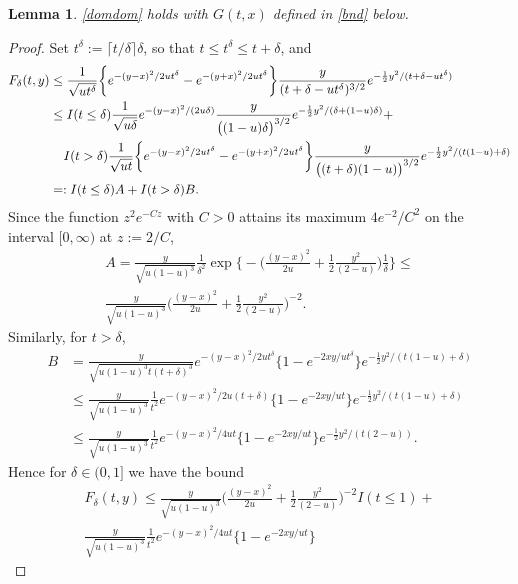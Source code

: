 \documentclass[reqno,10pt]{amsart}
\newtheorem{lem}[thm]{Lemma}
\theoremstyle{definition}
\theoremstyle{remark}
\numberwithin{equation}{section}
\begin{document}
\begin{lem}\label{lem}
\eqref{domdom} holds with $G(t,x)$ defined in \eqref{bnd} below.
\end{lem}
\begin{proof}
Set $t^\delta :=\lceil t/\delta\rceil\delta$, so that
$t\le t^\delta\le t+\delta$, and
\begin{align*}
F_\delta(t,y)&\le
\frac{1}{\sqrt{ u t^\delta}}\bigg\{
e^{-(y-x)^2/2u t^\delta}-e^{-(y+x)^2/2u t^\delta}\bigg\}
\frac{y}{ (t+\delta-ut^\delta)^{3/2}}e^{-\frac 1 2 y^2/(t+\delta-ut^\delta)}
\\
&\le I(t\le \delta)\frac{1}{\sqrt{ u \delta}}e^{-(y-x)^2/(2u \delta)}
\frac{y}{ \big((1-u)\delta\big)^{3/2}}e^{-\frac 1 2 y^2/(\delta+(1-u)\delta)}+
\\
&\hskip 0.15in I(t> \delta)
\frac{1}{\sqrt{ u t}}
\bigg\{
e^{-(y-x)^2/2u t^\delta}-e^{-(y+x)^2/2u t^\delta}\bigg\}\frac{y}{ \big((t+\delta)(1-u)\big)^{3/2}}e^{-\frac 1 2 y^2/(t(1-u)+\delta)}\\
&=: I(t\le \delta)A+I(t>\delta)B.
\end{align*}
Since the function $z^2e^{-Cz}$ with $C>0$ attains its maximum
$4e^{-2}/C^2$ on the interval $[0,\infty)$ at $z:=2/C$,
\begin{multline*}
A=
\frac{y}{\sqrt{ u (1-u)^3}}
\frac{1}{ \delta^2}
\exp\bigg\{-\bigg(\frac{(y-x)^2}{2u }+\frac 1 2 \frac{y^2}{(2-u)}\bigg)\frac 1\delta\bigg\}\le \\
\frac{y}{\sqrt{ u (1-u)^3}}
\bigg(\frac{(y-x)^2}{2u }+\frac 1 2 \frac{y^2}{(2-u)}\bigg)^{-2}.
\end{multline*}
Similarly, for $t> \delta$,
\begin{align*}
B&=
\frac{y}{\sqrt{u(1-u)^3t(t+\delta)^3}}
e^{-(y-x)^2/2u t^\delta}\bigg\{
1-e^{-2xy/u t^\delta}\bigg\}
e^{-\frac 1 2 y^2/(t(1-u)+\delta)}  \\
&\le\frac{y}{\sqrt{u(1-u)^3}}\frac{1}{ t^2}
e^{-(y-x)^2/2u (t+\delta)}\bigg\{
1-e^{-2xy/u t}\bigg\}
e^{-\frac 1 2 y^2/(t(1-u)+\delta)} \\
& \le\frac{y}{\sqrt{u(1-u)^3}}\frac{1}{ t^2}
e^{-(y-x)^2/4u t}\bigg\{
1-e^{-2xy/u t}\bigg\}
e^{-\frac 1 2 y^2/(t(2-u))}.
\end{align*}
Hence  for $\delta\in(0,1]$ we have the bound
\begin{multline}\label{bnd}
F_\delta(t,y)\le
\frac{y}{\sqrt{ u (1-u)^3}}
\bigg(\frac{(y-x)^2}{2u }+\frac 1 2 \frac{y^2}{(2-u)}\bigg)^{-2}I(t\le 1)
+\\
\frac{y}{\sqrt{u(1-u)^3}}\frac{1}{ t^2}
e^{-(y-x)^2/4u t}\bigg\{
1-e^{-2xy/u t}\bigg\}

\end{multline}
\end{proof}
\end{document}
